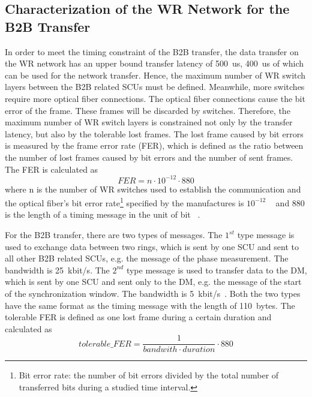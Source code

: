 \subsection{Characterization of the WR Network for the B2B Transfer}
In order to meet the timing constraint of the B2B transfer, the data transfer on the WR network has an upper bound transfer latency of \SI{500}{us}, \SI{400}{us} of which can be used for the network transfer. Hence, the maximum number of WR switch layers between the B2B related SCUs must be defined. Meanwhile, more switches require more optical fiber connections. The optical fiber connections cause the bit error of the frame. These frames will be discarded by switches. Therefore, the maximum number of WR switch layers is constrained not only by the transfer latency, but also by the tolerable lost frames. The lost frame caused by bit errors is measured by the frame error rate (FER), which is defined as the ratio between the number of lost frames caused by bit errors and the number of sent frames. The FER is calculated as ~\cite{prados_white_2011}
\begin{equation}
\label{FER}
	FER=n\cdot10^{-12}\cdot880
\end{equation}
where n is the number of WR switches used to establish the communication and the optical fiber's bit error rate\footnote{Bit error rate: the number of bit errors divided by the total number of transferred bits during a studied time interval. } specified by the manufactures is $10^{-12}$ ~\cite{noauthor_datasheet_nodate} and 880 is the length of a timing message  in the unit of bit ~\cite{beck_timing_2015}.  

For the B2B transfer, there are two types of messages. The $1^\mathit{st}$ type message is used to exchange data between two rings, which is sent by one SCU and sent to all other B2B related SCUs, e.g. the message of the phase measurement. The bandwidth is \SI{25}{kbit/s}. The $2^\mathit{nd}$ type message is used to transfer data to the DM, which is sent by one SCU and sent only to the DM, e.g. the message of the start of the synchronization window. The bandwidth is \SI{5}{kbit/s}~\cite{bai_f-tc-c-05_2016}. Both the two types have the same format as the timing message with the length of \SI{110}{bytes}. The tolerable FER is defined as one lost frame during a certain duration and calculated as 
\begin{equation}
	tolerable\_FER=\frac{1}{bandwith\cdot duration}\cdot 880
\end{equation}

